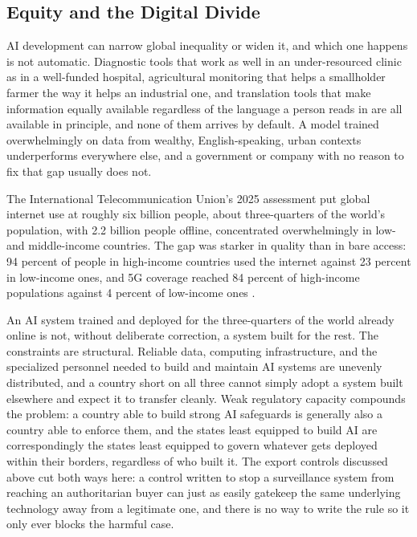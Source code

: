 \subsection{Equity and the Digital Divide}
\label{sec:8.7.9}
AI development can narrow global inequality or widen it, and which one happens is not automatic. Diagnostic tools that work as well in an under-resourced clinic as in a well-funded hospital, agricultural monitoring that helps a smallholder farmer the way it helps an industrial one, and translation tools that make information equally available regardless of the language a person reads in are all available in principle, and none of them arrives by default. A model trained overwhelmingly on data from wealthy, English-speaking, urban contexts underperforms everywhere else, and a government or company with no reason to fix that gap usually does not.

\begin{esbox}
The International Telecommunication Union's 2025 assessment put global internet use at roughly six billion people, about three-quarters of the world's population, with 2.2 billion people offline, concentrated overwhelmingly in low- and middle-income countries. The gap was starker in quality than in bare access: 94 percent of people in high-income countries used the internet against 23 percent in low-income ones, and 5G coverage reached 84 percent of high-income populations against 4 percent of low-income ones \autocite{itu2025facts}.

\end{esbox}
An AI system trained and deployed for the three-quarters of the world already online is not, without deliberate correction, a system built for the rest. The constraints are structural. Reliable data, computing infrastructure, and the specialized personnel needed to build and maintain AI systems are unevenly distributed, and a country short on all three cannot simply adopt a system built elsewhere and expect it to transfer cleanly. Weak regulatory capacity compounds the problem: a country able to build strong AI safeguards is generally also a country able to enforce them, and the states least equipped to build AI are correspondingly the states least equipped to govern whatever gets deployed within their borders, regardless of who built it. The export controls discussed above cut both ways here: a control written to stop a surveillance system from reaching an authoritarian buyer can just as easily gatekeep the same underlying technology away from a legitimate one, and there is no way to write the rule so it only ever blocks the harmful case.

